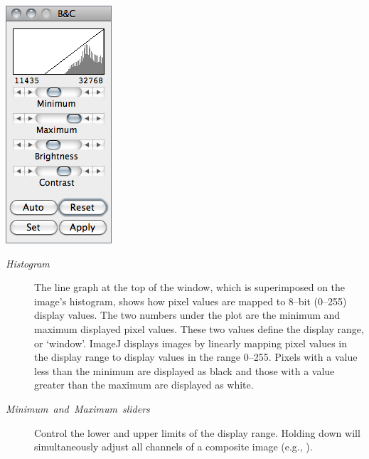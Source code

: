 \begin{minipage}[c][1\totalheight][t]{0.235\columnwidth}%
\includegraphics[scale=0.55]{images/BC}%
\end{minipage}%
\begin{minipage}[c][1\totalheight][t]{0.765\columnwidth}%
\begin{description}
\item [{\emph{Histogram}}] The line graph at the top of the window, which
is superimposed on the image's histogram, shows how pixel values are
mapped to 8--bit (0--255) display values. The two numbers under the
plot are the minimum and maximum displayed pixel values. These two
values define the display range, or `window'. ImageJ displays images
by linearly mapping pixel values in the display range to display values
in the range 0--255. Pixels with a value less than the minimum are
displayed as black and those with a value greater than the maximum
are displayed as white.
\item [{\emph{Minimum\ and\ Maximum\ sliders}}] Control the lower and
upper limits of the display range. Holding down 
will simultaneously adjust all channels of a composite image (e.g.,
).\end{description}
%
\end{minipage}
